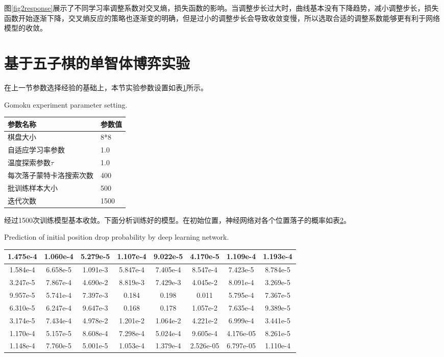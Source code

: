 图\ref{fig2response}展示了不同学习率调整系数对交叉熵，损失函数的影响。当调整步长过大时，曲线基本没有下降趋势，减小调整步长，损失函数开始逐渐下降，交叉熵反应的策略也逐渐变的明确，但是过小的调整步长会导致收敛变慢，所以选取合适的调整系数能够更有利于网络模型的收敛。
\section{基于五子棋的单智体博弈实验}

在上一节参数选择经验的基础上，本节实验参数设置如表\ref{canshu}所示。

\begin{table}[htpb]
	\centering
	{Gomoku experiment parameter setting.}
	\label{canshu}
	\begin{tabular}{ll} \toprule
		参数名称   & 参数值  \\  \midrule
		棋盘大小 & 8*8 \\ 
		自适应学习率参数 & 1.0 \\ 
		温度探索参数$\tau$& 1.0 \\ 
		每次落子蒙特卡洛搜索次数 & 400 \\ 
		批训练样本大小 & 500 \\ 
		迭代次数 & 1500 \\ 
		\bottomrule
	\end{tabular}
\end{table}


经过1500次训练模型基本收敛。下面分析训练好的模型。在初始位置，神经网络对各个位置落子的概率如表\ref{tab:gailv}。
\begin{table}[htbp]
	\centering
	{Prediction of initial position drop probability by deep learning network.}
	\label{tab:gailv}
	\begin{tabular}{|c|c|c|c|c|c|c|c|}
		\hline 
		1.475e-4 & 1.060e-4 & 5.279e-5 & 1.107e-4 & 9.022e-5 & 4.170e-5 & 1.109e-4 & 1.193e-4 \\ 
		\hline 
		1.584e-4 & 6.658e-5 & 1.091e-3 & 5.847e-4 & 7.405e-4 & 8.547e-4 & 7.423e-5 & 8.784e-5 \\ 
		\hline 
		3.247e-5 & 7.867e-4& 4.690e-2 & 8.819e-3 & 7.429e-3&4.045e-2 & 8.091e-4 & 3.269e-5 \\ 
		\hline 
		9.957e-5& 5.741e-4 & 7.397e-3 & 0.184 & 0.198 & 0.011& 5.795e-4 & 7.367e-5 \\ 
		\hline 
		6.310e-5 &6.247e-4& 9.647e-3& 0.168 & 0.178 & 1.057e-2 & 7.635e-4 & 9.389e-5 \\ 
		\hline 
		3.174e-5 & 7.434e-4 & 4.978e-2 & 1.201e-2 & 1.064e-2 & 4.221e-2 & 6.999e-4 & 3.441e-5 \\ 
		\hline 
		1.170e-4 & 5.157e-5& 8.608e-4 & 7.298e-4 & 5.024e-4 & 9.605e-4 & 4.176e-05 & 8.261e-5\\ 
		\hline 
		1.148e-4 &7.760e-5 &  5.001e-5 & 1.053e-4 & 1.379e-4 & 2.526e-05 & 6.797e-05 & 1.110e-4 \\ 
		\hline 
	\end{tabular} 
\end{table}

